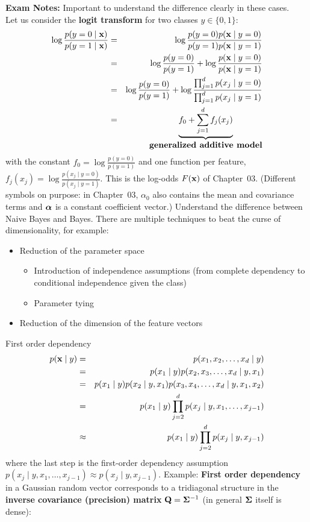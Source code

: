 \begin{figure}[htbp]
    \label{fig:naive_bayes_gauss}
  \end{figure}
    \textbf{Exam Notes:} Important to understand the difference clearly in these cases. \\
   Let us consider the \textbf{logit transform} for two classes $y\in\{0,1\}$:
   \begin{eqnarray*}
    \log \frac{p(y=0\mid\bm{\mathrm{x}})}{p(y=1\mid\bm{\mathrm{x}})}
      &=& \log\frac{p(y=0) p(\bm{\mathrm{x}} \mid y=0)}{p(y=1) p(\bm{\mathrm{x}} \mid y=1)}\\
      &=& \log\frac{p(y=0)}{p(y=1)} + \log\frac{p(\bm{\mathrm{x}} \mid y=0)}{p(\bm{\mathrm{x}} \mid y=1)}\\
      &=& \log\frac{p(y=0)}{p(y=1)} + \log\frac{\prod_{j=1}^d p(x_j \mid y=0)}{\prod_{j=1}^d p(x_j \mid y=1)} \\
      &=& \underbrace{f_0 + \sum_{j=1}^d f_j(x_j)}_{\mbox {\textbf{generalized additive model}}}
   \end{eqnarray*}
   with the constant $f_0=\log\frac{p(y=0)}{p(y=1)}$ and one function per feature, $f_j(x_j)=\log\frac{p(x_j\mid y=0)}{p(x_j\mid y=1)}$. This is the log-odds $F(\bm{\mathrm{x}})$ of Chapter~03. (Different symbols on purpose: in Chapter~03, $\alpha_0$ also contains the mean and covariance terms and $\bm{\mathrm{\alpha}}$ is a constant coefficient vector.)
   Understand the difference between Naive Bayes and Bayes. There are multiple techniques to beat the curse of dimensionality, for example:
   \begin{itemize}
     \item Reduction of the parameter space
       \begin{itemize}
         \item Introduction of independence assumptions
           (from complete dependency to conditional independence given the class)
         \item Parameter tying
       \end{itemize}
    \item Reduction of the dimension of the feature vectors       
  \end{itemize}
   First order dependency
  \begin{eqnarray*}
    p(\bm{\mathrm{x}}\mid y) &=& p(x_1, x_2, \dots, x_d \mid y) \\
                 &=& p(x_1\mid y)p(x_2, x_3,\dots, x_d \mid y, x_1) \\
                 &=& p(x_1\mid y)p(x_2\mid y,x_1)p(x_3,x_4,\dots, x_d \mid y, x_1, x_2) \\
                 &=& p(x_1\mid y)\prod_{j=2}^d p(x_j\mid y, x_1,\dots,x_{j-1}) \\
                 &\approx& p(x_1\mid y)\prod_{j=2}^d p(x_j\mid y, x_{j-1})
  \end{eqnarray*}
  where the last step is the first-order dependency assumption $p(x_j\mid y,x_1,\dots,x_{j-1})\approx p(x_j\mid y,x_{j-1})$.
  Example:
    \textbf{First order dependency} in a Gaussian random vector corresponds to a tridiagonal structure in the \textbf{inverse covariance (precision) matrix} $\mathbf{Q} = \mathbf{\Sigma}^{-1}$ (in general $\mathbf{\Sigma}$ itself is dense):

